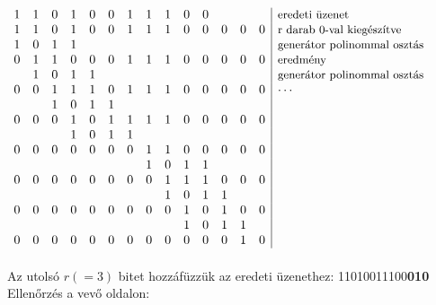 \documentclass[12pt]{article}
\begin{document}
    $\begin{array}{cccccccccccccc|l}
        1&1&0&1&0&0&1&1&1&0&0& & & &\text{\small eredeti üzenet} \\
        1&1&0&1&0&0&1&1&1&0&0&0&0&0&\text{\small r darab 0-val kiegészítve} \\
        1&0&1&1& & & & & & & & & & &\text{\small generátor polinommal osztás} \\
        0&1&1&0&0&0&1&1&1&0&0&0&0&0&\text{\small eredmény} \\
         &1&0&1&1& & & & & & & & & &\text{\small generátor polinommal osztás} \\
        0&0&1&1&1&0&1&1&1&0&0&0&0&0& \cdots \\
         & &1&0&1&1& & & & & & & & &  \\
        0&0&0&1&0&1&1&1&1&0&0&0&0&0&  \\
         & & &1&0&1&1& & & & & & & &  \\
        0&0&0&0&0&0&0&1&1&0&0&0&0&0&  \\
         & & & & & & &1&0&1&1& & & &  \\
        0&0&0&0&0&0&0&0&1&1&1&0&0&0&  \\
         & & & & & & & &1&0&1&1& & &  \\
        0&0&0&0&0&0&0&0&0&1&0&1&0&0&  \\
        & & & & & & & & & 1&0&1&1& &  \\
        0&0&0&0&0&0&0&0&0&0&0&0&1&0&  \\
    \end{array}$\\\\

    \noindent Az utolsó $r(=3)$ bitet hozzáfüzzük az eredeti üzenethez: 11010011100\textbf{010}\\

    \noindent Ellenőrzés a vevő oldalon:\\
\end{document}
